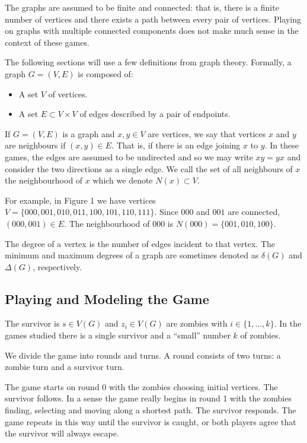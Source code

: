 
The graphs are assumed to be finite and connected: that is, there is a finite
number of vertices and there exists a path between every pair of vertices.
Playing on graphs with multiple connected components does not make much sense in the context of these games.

The following sections will use a few definitions from graph theory.
Formally, a graph $G = (V, E)$ is composed of:

\begin{itemize}
\item A set $V$ of vertices.
\item A set $E \subset V \times V$ of edges described by a pair of endpoints.
\end{itemize}

If $G = (V,E)$ is a graph and $x,y \in V$ are vertices, we say that vertices $x$ and $y$ are neighbours if $(x,y) \in E$.
That is, if there is an edge joining $x$ to $y$.
In these games, the edges are assumed to be undirected and so we may write $xy = yx$
and consider the two directions as a single edge.
We call the set of all neighbours of $x$ the neighbourhood of $x$ which we denote $N(x) \subset V$.

For example, in Figure 1 we have vertices $V = \{ 000, 001, 010, 011, 100, 101, 110, 111 \}$.
Since $000$ and $001$ are connected, $(000, 001) \in E$.
The neighbourhood of $000$ is $N(000) = \{ 001, 010, 100 \}$.

The degree of a vertex is the number of edges incident to that vertex. The minimum and maximum
degrees of a graph are sometimes denoted as $\delta(G)$ and $\Delta(G)$, respectively.

\subsection{Playing and Modeling the Game}

The survivor is $s \in V(G)$ and $z_i \in V(G)$ are zombies with $i \in \{1, \dots, k\}$.
In the games studied there is a single survivor and a ``small'' number $k$ of zombies.

We divide the game into rounds and turns. A round consists of two turns:
a zombie turn and a survivor turn.

The game starts on round 0 with the zombies choosing
initial vertices. The survivor follows. In a sense the game really begins in
round 1 with the zombies finding, selecting and moving along a shortest path.
The survivor responds. The game repeats in this way until the survivor is caught,
or both players agree that the survivor will always escape.

